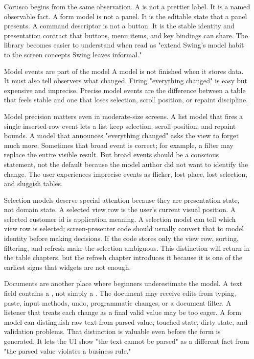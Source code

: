 Corusco begins from the same observation. A  is not a prettier label. It is a named observable fact. A form model is not a panel. It is the editable state that a panel presents. A command descriptor is not a button. It is the stable identity and presentation contract that buttons, menu items, and key bindings can share. The library becomes easier to understand when read as "extend Swing's model habit to the screen concepts Swing leaves informal."

\begin{detailbox}{Model events are part of the model}
A model is not finished when it stores data. It must also tell observers what changed. Firing "everything changed" is easy but expensive and imprecise. Precise model events are the difference between a table that feels stable and one that loses selection, scroll position, or repaint discipline.
\end{detailbox}

Model precision matters even in moderate-size screens. A list model that fires a
single inserted-row event lets a list keep selection, scroll position, and
repaint bounds. A model that announces "everything changed" asks the view to
forget much more. Sometimes that broad event is correct; for example, a filter
may replace the entire visible result. But broad events should be a conscious
statement, not the default because the model author did not want to identify the
change. The user experiences imprecise events as flicker, lost place, lost
selection, and sluggish tables.

Selection models deserve special attention because they are presentation state,
not domain state. A selected view row is the user's current visual position. A
selected customer id is application meaning. A  selection model can
tell which view row is selected; screen-presenter code should usually convert that to
model identity before making decisions. If the code stores only the view row,
sorting, filtering, and refresh make the selection ambiguous. This distinction
will return in the table chapters, but the refresh chapter introduces it because
it is one of the earliest signs that widgets are not enough.

Documents are another place where beginners underestimate the model. A text
field contains a , not simply a . The document may
receive edits from typing, paste, input methods, undo, programmatic changes, or
a document filter. A listener that treats each change as a final valid value may
be too eager. A form model can distinguish raw text from parsed value, touched
state, dirty state, and validation problems. That distinction is valuable even
before the form is generated. It lets the UI show "the text cannot be parsed" as
a different fact from "the parsed value violates a business rule."

